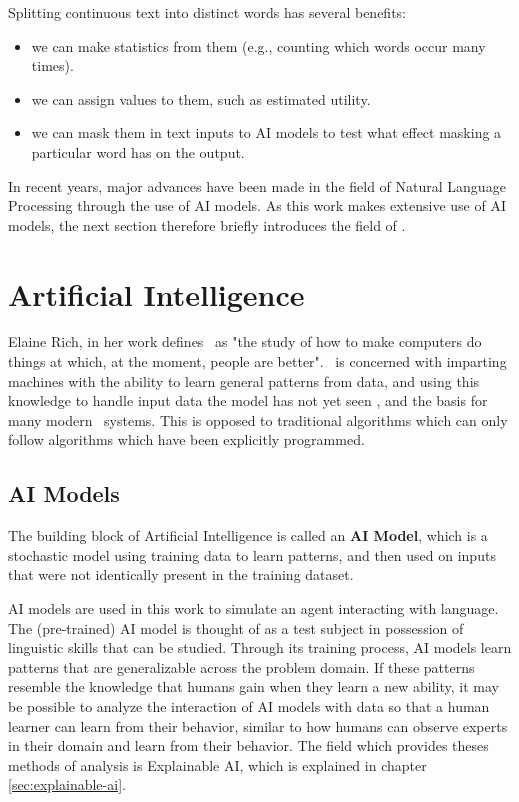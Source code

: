 Splitting continuous text into distinct words has several benefits:
\begin{itemize}
	\item we can make statistics from them (e.g., counting which words occur many times).
	\item we can assign values to them, such as estimated utility.
	\item we can mask them in text inputs to AI models to test what effect masking a particular word has on the output.
\end{itemize}


In recent years, major advances have been made in the field of Natural Language Processing through the use of AI models.
As this work makes extensive use of AI models, the next section therefore briefly introduces the field of \AI.

\section{Artificial Intelligence}
Elaine Rich, in her work  defines \AI\ as "the study of how to make computers do things at which, at the moment, people are better".
\ML\ is concerned with imparting machines with the ability to learn general patterns from data, and using this knowledge to handle input data the model has not yet seen , and the basis for many modern \AI\ systems.
This is opposed to traditional algorithms which can only follow algorithms which have been explicitly programmed.

\subsection{AI Models}
The building block of Artificial Intelligence is called an \textbf{AI Model}, which is a stochastic model using training data to learn patterns, and then used on inputs that were not identically present in the training dataset.

AI models are used in this work to simulate an agent interacting with language.
The (pre-trained) AI model is thought of as a test subject in possession of linguistic skills that can be studied.
Through its training process, AI models learn patterns that are generalizable across the problem domain.
If these patterns resemble the knowledge that humans gain when they learn a new ability, it may be possible to analyze the interaction of AI models with data so that a human learner can learn from their behavior, similar to how humans can observe experts in their domain and learn from their behavior.
The field which provides theses methods of analysis is Explainable AI, which is explained in chapter \ref{sec:explainable-ai}.

